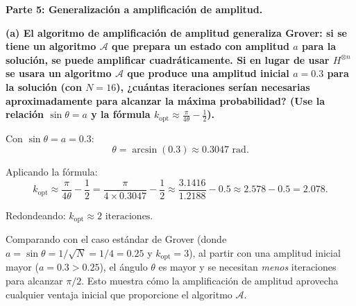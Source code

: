 \vspace{0.5cm}

{\bfseries Parte 5: Generalización a amplificación de amplitud.}

{\bfseries (a) El algoritmo de amplificación de amplitud generaliza Grover: si se tiene un algoritmo $\mathcal{A}$ que prepara un estado con amplitud $a$ para la solución, se puede amplificar cuadráticamente. Si en lugar de usar $H^{\otimes n}$ se usara un algoritmo $\mathcal{A}$ que produce una amplitud inicial $a = 0.3$ para la solución (con $N=16$), ¿cuántas iteraciones serían necesarias aproximadamente para alcanzar la máxima probabilidad? (Use la relación $\sin\theta = a$ y la fórmula $k_{\text{opt}} \approx \frac{\pi}{4\theta} - \frac{1}{2}$).}

Con $\sin\theta = a = 0.3$:
$$
    \theta = \arcsin(0.3) \approx 0.3047 \text{ rad}.
$$

Aplicando la fórmula:
$$
    k_{\text{opt}} \approx \frac{\pi}{4\theta} - \frac{1}{2} = \frac{\pi}{4 \times 0.3047} - \frac{1}{2} \approx \frac{3.1416}{1.2188} - 0.5 \approx 2.578 - 0.5 = 2.078.
$$

Redondeando: $\boxed{k_{\text{opt}} \approx 2 \text{ iteraciones.}}$

Comparando con el caso estándar de Grover (donde $a = \sin\theta = 1/\sqrt{N} = 1/4 = 0.25$ y $k_{\text{opt}} = 3$), al partir con una amplitud inicial mayor ($a=0.3 > 0.25$), el ángulo $\theta$ es mayor y se necesitan \emph{menos} iteraciones para alcanzar $\pi/2$. Esto muestra cómo la amplificación de amplitud aprovecha cualquier ventaja inicial que proporcione el algoritmo $\mathcal{A}$.

\vspace{1cm}